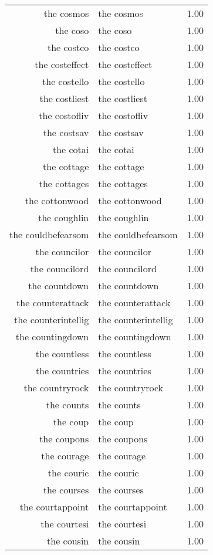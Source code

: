 \begin{table}[ht]
\begin{tabular}{rlr}
  the cosmos & the cosmos & 1.00 \\ 
  the coso & the coso & 1.00 \\ 
  the costco & the costco & 1.00 \\ 
  the costeffect & the costeffect & 1.00 \\ 
  the costello & the costello & 1.00 \\ 
  the costliest & the costliest & 1.00 \\ 
  the costofliv & the costofliv & 1.00 \\ 
  the costsav & the costsav & 1.00 \\ 
  the cotai & the cotai & 1.00 \\ 
  the cottage & the cottage & 1.00 \\ 
  the cottages & the cottages & 1.00 \\ 
  the cottonwood & the cottonwood & 1.00 \\ 
  the coughlin & the coughlin & 1.00 \\ 
  the couldbefearsom & the couldbefearsom & 1.00 \\ 
  the councilor & the councilor & 1.00 \\ 
  the councilord & the councilord & 1.00 \\ 
  the countdown & the countdown & 1.00 \\ 
  the counterattack & the counterattack & 1.00 \\ 
  the counterintellig & the counterintellig & 1.00 \\ 
  the countingdown & the countingdown & 1.00 \\ 
  the countless & the countless & 1.00 \\ 
  the countries & the countries & 1.00 \\ 
  the countryrock & the countryrock & 1.00 \\ 
  the counts & the counts & 1.00 \\ 
  the coup & the coup & 1.00 \\ 
  the coupons & the coupons & 1.00 \\ 
  the courage & the courage & 1.00 \\ 
  the couric & the couric & 1.00 \\ 
  the courses & the courses & 1.00 \\ 
  the courtappoint & the courtappoint & 1.00 \\ 
  the courtesi & the courtesi & 1.00 \\ 
  the cousin & the cousin & 1.00 \\ 

\end{tabular}
\end{table}

